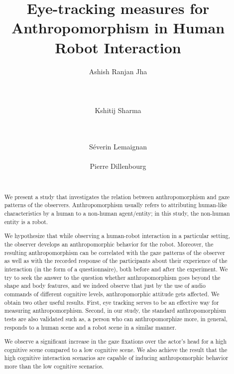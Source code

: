\documentclass{acm_proc_article-sp}
\begin{document}
\title{Eye-tracking measures for Anthropomorphism in Human Robot Interaction}

\author{
\alignauthor Ashish Ranjan Jha\\
       \\
       \\
        \\
\alignauthor Kshitij Sharma \\
       \\
       \\
\and
\alignauthor S\'{e}verin Lemaignan
       \\
       \\
\alignauthor Pierre Dillenbourg
        \\
       \\
}

\maketitle
\begin{abstract}


We present a study that investigates the relation between anthropomorphism and
gaze patterns of the observers. Anthropomorphism usually refers to attributing
human-like characteristics by a human to a non-human agent/entity; in this
study, the non-human entity is a robot. 

We hypothesize that while observing a human-robot interaction in a particular
setting, the observer develops an anthropomorphic behavior for the robot.
Moreover, the resulting anthropomorphism can be correlated with the gaze
patterns of the observer as well as with the recorded response of the
participants about their experience of the interaction (in the form of a
questionnaire), both before and after the experiment. We try to seek the answer
to the question whether anthropomorphism goes beyond the shape and body
features, and we indeed observe that just by the use of audio commands of
different cognitive levels, anthropomorphic attitude gets affected. We obtain
two other useful results. First, eye tracking serves to be an effective way for
measuring anthropomorphism. Second, in our study, the standard anthropomorphism
tests are also validated such as, a person who can anthropomorphize more, in
general, responds to a human scene and a robot scene in a similar manner.

We observe a significant increase in the gaze fixations over the actor's head
for a high cognitive scene compared to a low cognitive scene. We also achieve
the result that the high cognitive interaction scenarios are capable of inducing
anthropomorphic behavior more than the low cognitive scenarios.

\end{abstract}
\end{document}
